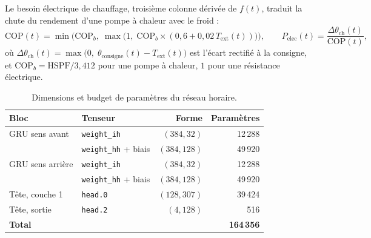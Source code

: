 \documentclass[11pt,a4paper]{article}
\begin{document}
Le besoin électrique de chauffage, troisième colonne dérivée de $f(t)$, traduit la chute du
rendement d'une pompe à chaleur avec le froid :
%
\begin{equation}
  \mathrm{COP}(t) = \min\!\Big(\mathrm{COP}_{b},\;
  \max\!\big(1,\; \mathrm{COP}_{b} \times (0{,}6 + 0{,}02\,T_{\mathrm{ext}}(t))\big)\Big),
  \qquad
  P_{\mathrm{elec}}(t) = \frac{\Delta\theta_{\mathrm{ch}}(t)}{\mathrm{COP}(t)},
  \label{eq:cop}
\end{equation}
%
où $\Delta\theta_{\mathrm{ch}}(t) = \max\big(0,\; \theta_{\mathrm{consigne}}(t) -
T_{\mathrm{ext}}(t)\big)$ est l'écart rectifié à la consigne, et
$\mathrm{COP}_{b} = \mathrm{HSPF}/3{,}412$ pour une pompe à chaleur, $1$ pour une
résistance électrique.

\begin{table}[htbp]
  \centering
  \caption{Dimensions et budget de paramètres du réseau horaire.}
  \label{tab:parametres}
  \begin{tabular}{llrr}
    \toprule
    Bloc & Tenseur & Forme & Paramètres \\
    \midrule
    GRU sens avant   & \texttt{weight\_ih}         & $(384, 32)$  & 12\,288 \\
                     & \texttt{weight\_hh} + biais & $(384, 128)$ & 49\,920 \\
    GRU sens arrière & \texttt{weight\_ih}         & $(384, 32)$  & 12\,288 \\
                     & \texttt{weight\_hh} + biais & $(384, 128)$ & 49\,920 \\
    Tête, couche 1   & \texttt{head.0}             & $(128, 307)$ & 39\,424 \\
    Tête, sortie     & \texttt{head.2}             & $(4, 128)$   & 516     \\
    \midrule
    \textbf{Total}   &                             &              & \textbf{164\,356} \\
    \bottomrule
  \end{tabular}
\end{table}
\end{document}
